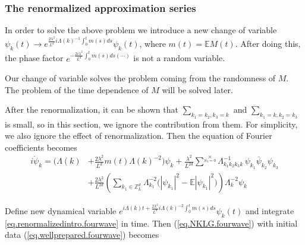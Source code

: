 \subsubsection{The renormalized approximation series} \label{sec.appsol.fourwave}%


In order to solve the above problem we introduce a new change of variable $\psi_k(t)\rightarrow e^{\frac{2\lambda^2}{L^{d}} i \Lambda(k)^{-1}\int^t_{0}m(s) ds} \psi_k(t)$, where $m(t)=\mathbb{E}M(t)$. After doing this, the phase factor $e^{- \frac{2i\lambda^2}{L^{d}} \int^t_{0}m(s) ds(\cdots)}$ is not a random variable. 

Our change of variable solves the problem coming from the randomness of $M$. The problem of the time dependence of $M$ will be solved later.

After the renormalization, it can be shown that $\sum_{k_1=k_2,k_3=k}$ and $\sum_{k_1=k,k_2=k_3}$ is small, so in this section, we ignore the contribution from them. For simplicity, we also ignore the effect of renormalization. Then the equation of Fourier coefficients becomes
\begin{equation}\label{eq.renormalizedintro.fourwave}
 \begin{split}
 i \dot{\psi}_{k} 
 = \bigg(\Lambda(k)&+\frac{2\lambda^2}{L^{d}} m(t)\Lambda(k)^{-2}\bigg) \psi_k
 +\frac{\lambda^2}{L^{2d}} \sum^{\times}\limits_{S_3=0} \Lambda_{k_1k_2k_3k}^{-1}\,\psi_{k_1}\overline{\psi}_{k_2} \psi_{k_3}
 \\
 &+\frac{2\lambda^2}{L^{2d}} \left(\sum\limits_{k_1\in \mathbb{Z}^d_L} \Lambda_{k_1}^{-2}\Big(|\psi_{k_1}|^2-\mathbb{E} |\psi_{k_1}|^2\Big) \right) \Lambda_{k}^{-2}\psi_{k} 
 \end{split}
 \end{equation}



Define new dynamical variable $e^{i\Lambda(k) t+\frac{2\lambda^2}{L^{d}} i \Lambda(k)^{-2}\int^t_{0}m(s) ds} \psi_k(t)$ and integrate \eqref{eq.renormalizedintro.fourwave} in time. Then (\ref{eq.NKLG.fourwave}) with initial data (\ref{eq.wellprepared.fourwave}) becomes

